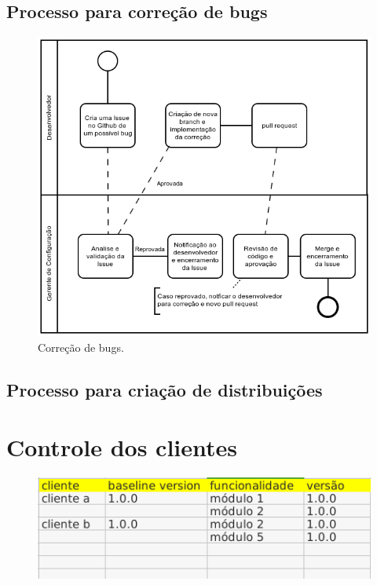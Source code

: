 \documentclass{article}
\begin{document}
        \subsection{Processo para correção de bugs}
	        \begin{figure}[H]
	        	\includegraphics[width=\linewidth]{bug.png}
	        	\caption{Correção de bugs.}
	        \end{figure}
        \subsection{Processo para criação de distribuições}

    \section{Controle dos clientes}
        \begin{figure}[H]
			\centering
			\includegraphics[width=0.7\linewidth]{controle_cliente_software.png}
			\caption{}
			\label{fig:controleclientesoftware}
		\end{figure}
        
    \newpage
	\begin{appendix}
		\listoffigures
		\listoftables
	\end{appendix}
\end{document}
